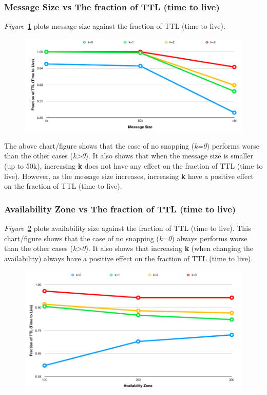 {\subsubsection{Message Size vs The fraction of TTL (time to live)}
\emph{Figure}~\ref{fig:scenario2_2_message_size} plots message size against the fraction of TTL (time to live).
\begin{figure}[H]
  \centering
  \includegraphics[scale=0.45]{./figures/scenario2_2_message_size}
  \label{fig:scenario2_2_message_size}
\end{figure}
The above chart/figure shows that the case of no snapping (\textit{k=0}) performs worse than the other cases (\textit{k>0}). It also shows that when the message size is smaller (up to 50k), increasing \textbf{k} does not have any effect on the fraction of TTL (time to live). However, as the message size increases, increasing \textbf{k} have a positive effect on the fraction of TTL (time to live).

\subsubsection{Availability Zone vs The fraction of TTL (time to live)}
\emph{Figure}~\ref{fig:scenario2_3_availability_zone} plots availability size against the fraction of TTL (time to live). This chart/figure shows that the case of no snapping (\textit{k=0}) always performs worse than the other cases (\textit{k>0}). It also shows that increasing \textbf{k} (when changing the availability) always have a positive effect on the fraction of TTL (time to live).
\begin{figure}[H]
  \centering
  \includegraphics[scale=0.45]{./figures/scenario2_3_availability_zone}
  \label{fig:scenario2_3_availability_zone}
\end{figure}

}
